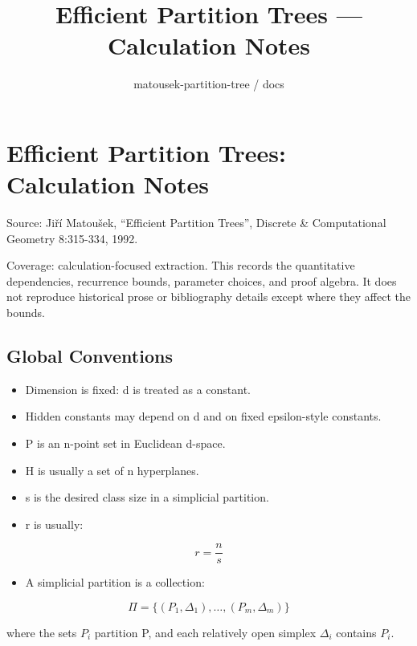 \documentclass[
  11pt,
]{article}
\title{Efficient Partition Trees — Calculation Notes}
\subtitle{matousek-partition-tree / docs}
\author{}
\date{}
\providecommand{\tightlist}{%
  \setlength{\itemsep}{0pt}\setlength{\parskip}{0pt}}
\begin{document}
\maketitle

{
\hypersetup{linkcolor=}
\setcounter{tocdepth}{3}
\tableofcontents
}
\hypertarget{efficient-partition-trees-calculation-notes}{%
\section{Efficient Partition Trees: Calculation
Notes}\label{efficient-partition-trees-calculation-notes}}

Source: Jiří Matoušek, ``Efficient Partition Trees'', Discrete \&
Computational Geometry 8:315-334, 1992.

Coverage: calculation-focused extraction. This records the quantitative
dependencies, recurrence bounds, parameter choices, and proof algebra.
It does not reproduce historical prose or bibliography details except
where they affect the bounds.

\hypertarget{global-conventions}{%
\subsection{Global Conventions}\label{global-conventions}}

\begin{itemize}
\tightlist
\item
  Dimension is fixed: d is treated as a constant.
\item
  Hidden constants may depend on d and on fixed epsilon-style constants.
\item
  P is an n-point set in Euclidean d-space.
\item
  H is usually a set of n hyperplanes.
\item
  s is the desired class size in a simplicial partition.
\item
  r is usually:
\end{itemize}

\[
r=\frac{n}{s}
\]

\begin{itemize}
\tightlist
\item
  A simplicial partition is a collection:
\end{itemize}

\[
\Pi=\lbrace (P_1,\Delta_1),\ldots,(P_m,\Delta_m) \rbrace
\]

where the sets \(P_i\) partition P, and each relatively open simplex
\(\Delta_i\) contains \(P_i\).
\end{document}

